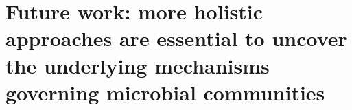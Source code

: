 



\section{Future work: more holistic approaches are essential to uncover the underlying mechanisms governing microbial communities}
\label{chap:fut-work}


